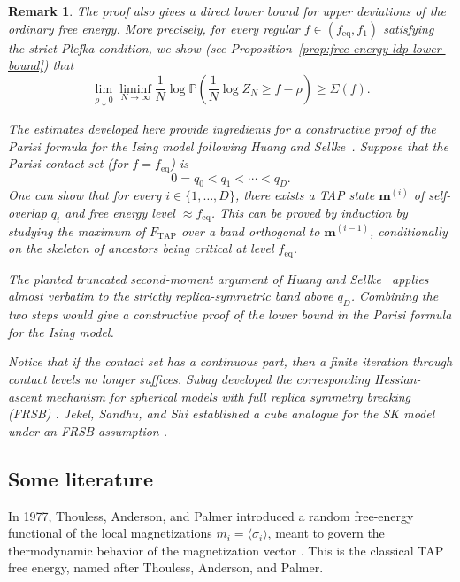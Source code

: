 \documentclass[a4paper,10pt,reqno]{amsart}
\numberwithin{equation}{section}
\newtheorem{remark}{Remark}[section]%
\newcommand{\dP}{\mathbb{P}}%
\newcommand{\TAP}{\mathrm{TAP}}
\newcommand{\eq}{\mathrm{eq}}
\newcommand{\bfm}{\mathbf{m}}
\begin{document}
	\begin{remark}
		The proof also gives a direct lower bound for upper deviations of the
		ordinary free energy. More precisely, for every regular
		\(f\in(f_{\eq},f_1)\) satisfying the strict Plefka condition, we show (see Proposition~\ref{prop:free-energy-ldp-lower-bound}) that
		\[
		\lim_{\rho\downarrow0}\liminf_{N\to\infty}
		\frac1N\log\dP\left(
		\frac1N\log Z_N\ge f-\rho
		\right)
		\ge\Sigma(f).
		\]
		
		The estimates developed here provide ingredients for a constructive proof
		of the Parisi formula for the Ising model following Huang and
		Sellke~\cite{HuangSellke}. Suppose that the
		Parisi contact set (for $f=f_\eq$) is
		\[
		0=q_0<q_1<\cdots<q_D.
		\]
		One can show that for every $i\in \{1,\ldots,D\}$, there exists a TAP state $\bfm^{(i)}$ of self-overlap $q_i$ and free energy level $\approx f_\eq$. This can be proved by induction by studying the maximum of $F_\TAP$ over a band orthogonal to $\bfm^{(i-1)}$, conditionally on the skeleton of ancestors being critical at level $f_\eq$.
		
		
		The planted truncated second-moment argument of Huang and
		Sellke~\cite[Proposition~2.7]{HuangSellke} applies almost verbatim to the
		strictly replica-symmetric band above \(q_D\). Combining the two steps
		would give a constructive proof of the lower bound in the Parisi formula
		for the Ising model.
		
		Notice that if the contact set has a continuous part, then a finite iteration through
		contact levels no longer suffices. Subag developed the corresponding
		Hessian-ascent mechanism for spherical models with full replica symmetry
		breaking (FRSB)
		\cite[Theorem~4]{SubagHessianAscent}. Jekel, Sandhu, and Shi established a
		cube analogue for the SK model under an FRSB assumption
		\cite[Theorem~1.5]{JekelSandhuShi}.
	\end{remark}
	
	
	
	
	
	\subsection{Some literature}
	
	In 1977, Thouless, Anderson, and Palmer introduced a random free-energy
	functional of the local magnetizations \(m_i=\langle\sigma_i\rangle\), meant
	to govern the thermodynamic behavior of the magnetization vector
	\cite{ThoulessAndersonPalmer1977}. This is the classical TAP free energy,
	named after Thouless, Anderson, and Palmer.
	
\end{document}
